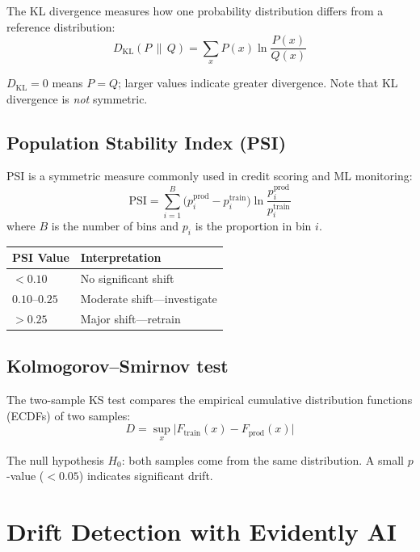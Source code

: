 The KL divergence measures how one probability distribution differs
from a reference distribution:
\begin{equation}
  D_{\mathrm{KL}}(P \,\|\, Q)
    = \sum_{x} P(x) \ln \frac{P(x)}{Q(x)}
\end{equation}

$D_{\mathrm{KL}} = 0$ means $P = Q$; larger values indicate greater
divergence. Note that KL divergence is \emph{not} symmetric.

\subsection{Population Stability Index (PSI)}

PSI is a symmetric measure commonly used in credit scoring and ML
monitoring:
\begin{equation}
  \mathrm{PSI} = \sum_{i=1}^{B}
    \bigl(p_i^{\text{prod}} - p_i^{\text{train}}\bigr)
    \ln \frac{p_i^{\text{prod}}}{p_i^{\text{train}}}
\end{equation}
where $B$ is the number of bins and $p_i$ is the proportion in bin $i$.

\begin{center}
\begin{tabular}{@{}ll@{}}
\toprule
\textbf{PSI Value} & \textbf{Interpretation} \\
\midrule
$< 0.10$ & No significant shift \\
$0.10$--$0.25$ & Moderate shift---investigate \\
$> 0.25$ & Major shift---retrain \\
\bottomrule
\end{tabular}
\end{center}

\subsection{Kolmogorov--Smirnov test}

The two-sample KS test compares the empirical cumulative distribution
functions (ECDFs) of two samples:
\begin{equation}
  D = \sup_x \bigl|F_{\text{train}}(x) - F_{\text{prod}}(x)\bigr|
\end{equation}

The null hypothesis $H_0$: both samples come from the same
distribution. A small $p$-value ($< 0.05$) indicates significant
drift.

\section{Drift Detection with Evidently AI}
\label{sec:evidently}

